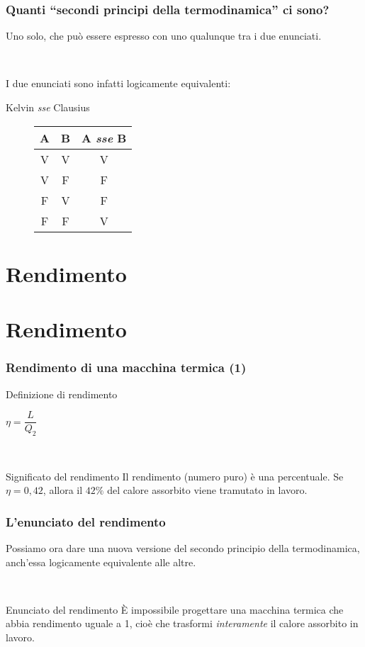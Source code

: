 \documentclass[]{beamer}
\theoremstyle{plain}
\begin{document}
\begin{frame}
\frametitle{Quanti ``secondi principi della termodinamica'' ci sono?}
\pause
\alert<2>{Uno solo}, che può essere espresso con uno qualunque tra i due enunciati.
\pause

~

I due enunciati sono infatti \alert{logicamente equivalenti}:
\begin{center}
Kelvin \emph{sse} Clausius
\end{center}
\begin{figure}\centering
\begin{tabular}{|c|c|c|}\hline
  A&B&A \emph{sse} B\\\hline
  V&V&V \\\hline
  V&F&F \\\hline
  F&V&F \\\hline
  F&F&V \\\hline
\end{tabular}
\end{figure}

\end{frame}

  

\section{Rendimento}

\section{Rendimento}

\begin{frame}
  \frametitle{Rendimento di una macchina termica (1)}
  \begin{block}{Definizione di rendimento}
    \begin{center}
      \colorbox{marroncino!30}{$ \eta = \dfrac{L}{Q_2} $}
    \end{center}\pause
\end{block}

~

\begin{alertblock}{Significato del rendimento}
  Il rendimento (numero puro) è una percentuale. Se $ \eta = 0,42 $, allora il $ 42\% $ del calore assorbito viene tramutato in lavoro.
\end{alertblock}
\end{frame}

\begin{frame}
  \frametitle{L'enunciato del rendimento}
  Possiamo ora dare una nuova versione del \alert{secondo principio della termodinamica}, anch'essa logicamente equivalente alle altre.
  
  ~
    \begin{block}{Enunciato del rendimento}
      È impossibile progettare una macchina termica che abbia rendimento uguale a 1, cioè che trasformi \emph{interamente} il calore assorbito in lavoro.
    \end{block}
  \end{frame}
  
\end{document}
